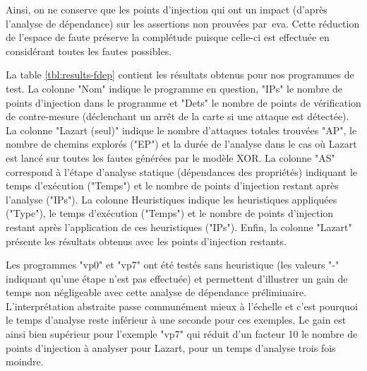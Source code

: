                 Ainsi, on ne conserve que les points d'injection qui ont un impact (d'après l'analyse de dépendance) sur les assertions non prouvées par \gls{eva}.
                Cette réduction de l'espace de faute préserve la complétude puisque celle-ci est effectuée en considérant toutes les fautes possibles.
                
                La table \ref{tbl:results-fdep} contient les résultats obtenus pour nos programmes de test. La colonne "Nom" indique le programme en question, "IPs" le nombre de points d'injection dans le programme et "Dets" le nombre de points de vérification de contre-mesure (déclenchant un arrêt de la carte si une attaque est détectée).
                La colonne "Lazart (seul)" indique le nombre d'attaques totales trouvées "AP", le nombre de chemins explorés ("EP") et la durée de l'analyse dans le cas où Lazart est lancé sur toutes les fautes générées par le modèle XOR.
                La colonne "AS" correspond à l'étape d'analyse statique (dépendances des propriétés) indiquant le temps d'exécution ("Temps") et le nombre de points d'injection restant après l'analyse ("IPs").
                La colonne Heuristiques indique les heuristiques appliquées ("Type"), le temps d'exécution ("Temps") et le nombre de points d'injection restant après l'application de ces heuristiques ("IPs").
                Enfin, la colonne "Lazart" présente les résultats obtenus avec les points d'injection restants.
                
                Les programmes "vp0" et "vp7" ont été testés sans heuristique (les valeurs \mbox{"-"} indiquant qu'une étape n'est pas effectuée) et permettent d'illustrer un gain de temps non négligeable avec cette analyse de dépendance préliminaire. L'interprétation abstraite passe communément mieux à l'échelle et c'est pourquoi le temps d'analyse reste inférieur à une seconde pour ces exemples.
                Le gain est ainsi bien supérieur pour l'exemple "vp7" qui réduit d'un facteur 10 le nombre de points d'injection à analyser pour Lazart, pour un temps d'analyse trois fois moindre.
                
